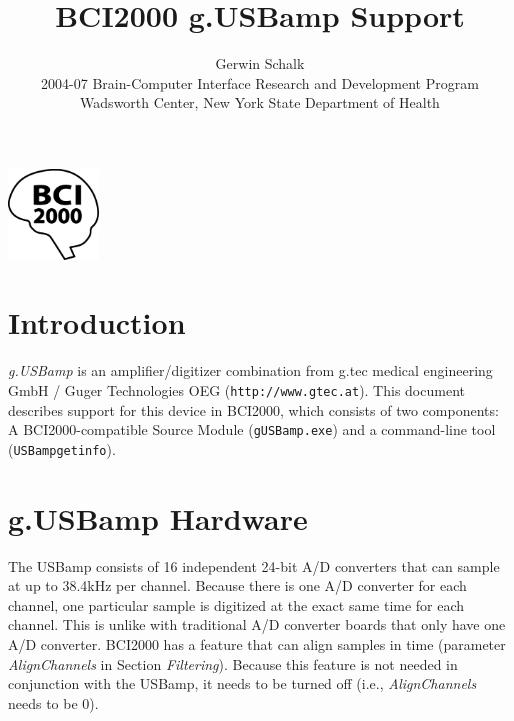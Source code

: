 \documentclass[letterpaper, oneside, 12pt]{article}
\begin{document}
%
\title{BCI2000 g.USBamp Support}
\author{Gerwin Schalk\\ \small{2004-07 Brain-Computer Interface Research and Development Program}\\ \small{Wadsworth Center, New York State Department of Health}}
\maketitle
\centerline{\includegraphics[height=2.4cm,keepaspectratio=true]{BCI2000logo}}


\newpage


\section{Introduction}

\sloppypar \emph{g.USBamp} is an amplifier/digitizer combination from g.tec 
medical engineering GmbH / Guger Technologies OEG (\texttt{http://www.gtec.at}). 
This document describes support for this device in BCI2000, which consists of 
two components: A BCI2000-compatible Source Module (\texttt{gUSBamp.exe}) and a 
command-line tool (\texttt{USBampgetinfo}). 

\section{g.USBamp Hardware}

The USBamp consists of 16 independent 24-bit A/D converters that can sample at 
up to 38.4kHz per channel. Because there is one A/D converter for each channel, 
one particular sample is digitized at the exact same time for each channel. This 
is unlike with traditional A/D converter boards that only have one A/D 
converter. BCI2000 has a feature that can align samples in time (parameter 
\emph{AlignChannels} in Section \emph{Filtering}). Because this feature is not 
needed in conjunction with the USBamp, it needs to be turned off (i.e., 
\emph{AlignChannels} needs to be 0).
\end{document}

